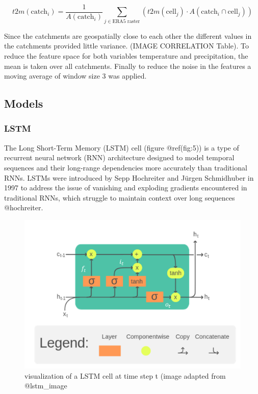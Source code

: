 \documentclass[
]{article}
\begin{document}
\[ t2m(\text{catch}_i) = \frac{1}{A(\text{catch}_i)} \sum_{j \in \text{ERA5 raster}} \left( t2m(\text{cell}_j) \cdot A(\text{catch}_i \cap \text{cell}_j) \right) \tag{1} \]

Since the catchments are geospatially close to each other the different
values in the catchments provided little variance. (IMAGE CORRELATION
Table). To reduce the feature space for both variables temperature and
precipitation, the mean is taken over all catchments. Finally to reduce
the noise in the features a moving average of window size 3 was applied.

\hypertarget{models}{%
\subsection{Models}\label{models}}

\hypertarget{lstm}{%
\subsubsection{LSTM}\label{lstm}}

The Long Short-Term Memory (LSTM) cell (figure @ref(fig:5)) is a type of
recurrent neural network (RNN) architecture designed to model temporal
sequences and their long-range dependencies more accurately than
traditional RNNs. LSTMs were introduced by Sepp Hochreiter and Jürgen
Schmidhuber in 1997 to address the issue of vanishing and exploding
gradients encountered in traditional RNNs, which struggle to maintain
context over long sequences @hochreiter.

\begin{figure}

{\centering \includegraphics[width=500px]{work/07-hydroLSTM/images/LSTM} 

}

\caption{visualization of a LSTM cell at time step t (image adapted from @lstm_image}\label{fig:5}
\end{figure}
\end{document}
